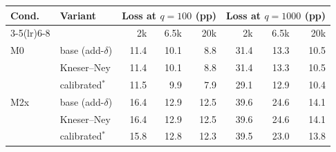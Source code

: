 \begin{tabular}{llrrrrrr}
\toprule
Cond. & Variant & \multicolumn{3}{c}{Loss at $q=100$ (pp)} & \multicolumn{3}{c}{Loss at $q=1000$ (pp)} \\
\cmidrule(lr){3-5}\cmidrule(lr){6-8}
 & & 2k & 6.5k & 20k & 2k & 6.5k & 20k \\
\midrule
M0 & base (add-$\delta$) & 11.4 & 10.1 & 8.8 & 31.4 & 13.3 & 10.5 \\
 & Kneser--Ney & 11.4 & 10.1 & 8.8 & 31.4 & 13.3 & 10.5 \\
 & calibrated$^{\ast}$ & 11.5 & 9.9 & 7.9 & 29.1 & 12.9 & 10.4 \\
\midrule
M2x & base (add-$\delta$) & 16.4 & 12.9 & 12.5 & 39.6 & 24.6 & 14.1 \\
 & Kneser--Ney & 16.4 & 12.9 & 12.5 & 39.6 & 24.6 & 14.1 \\
 & calibrated$^{\ast}$ & 15.8 & 12.8 & 12.3 & 39.5 & 23.0 & 13.8 \\
\bottomrule
\end{tabular}
